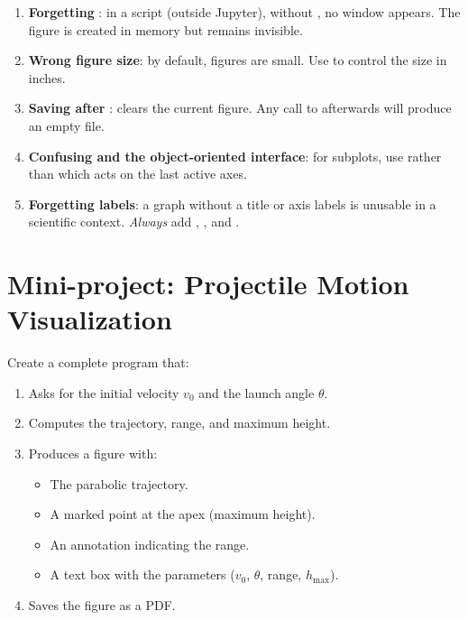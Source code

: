 \begin{errmark}
\begin{enumerate}
    \item \textbf{Forgetting }: in a script (outside Jupyter), without
    , no window appears. The figure is created in memory
    but remains invisible.

    \item \textbf{Wrong figure size}: by default, figures are small.
    Use  to control the size
    in inches.

    \item \textbf{Saving after }:  clears the current
    figure. Any call to  afterwards will produce an empty file.

    \item \textbf{Confusing  and the object-oriented interface}: for
    subplots, use  rather than  which acts on
    the last active axes.

    \item \textbf{Forgetting labels}: a graph without a title or axis labels
    is unusable in a scientific context. \emph{Always} add
    , , and .
\end{enumerate}
\end{errmark}

\section{Mini-project: Projectile Motion Visualization}

\begin{projet}
Create a complete program that:
\begin{enumerate}
    \item Asks for the initial velocity $v_0$ and the launch angle $\theta$.
    \item Computes the trajectory, range, and maximum height.
    \item Produces a figure with:
    \begin{itemize}
        \item The parabolic trajectory.
        \item A marked point at the apex (maximum height).
        \item An annotation indicating the range.
        \item A text box with the parameters ($v_0$, $\theta$, range, $h_{\max}$).
    \end{itemize}
    \item Saves the figure as a PDF.
\end{enumerate}
\end{projet}


